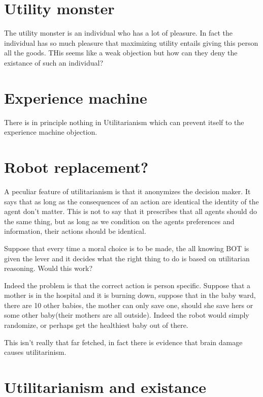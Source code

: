 \section{Utility monster}


The utility monster is an individual who has a lot of pleasure. In fact the individual has so much pleasure that maximizing utility entails giving this person all the goods. THis seems like a weak objection but how can they deny the existance of such an individual? 


\section{Experience machine}

There is in principle nothing in Utilitarianism which can prevent itself to the experience machine objection. 

\section{Robot replacement?}


A peculiar feature of utilitarianism is that it anonymizes the decision maker. It says that as long as the consequences of an action are identical the identity of the agent don't matter. This is not to say that it prescribes that all agents should do the same thing, but as long as we condition on the agents preferences and information, their actions should be identical. 

Suppose that every time a moral choice is to be made, the all knowing BOT is given the lever and it decides what the right thing to do is based on utilitarian reasoning. Would this work? 

Indeed the problem is that the correct action is person specific. Suppose that a mother is in the hospital and it is burning down, suppose that in the baby ward, there are 10 other babies, the mother can only save one, should she save hers or some other baby(their mothers are all outside). Indeed the robot would simply randomize, or perhaps get the healthiest baby out of there. 

This isn't really that far fetched, in fact there is evidence that brain damage causes utilitarinism. 

\section{Utilitarianism and existance}

